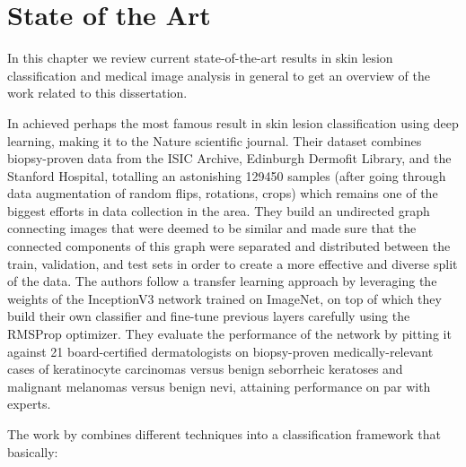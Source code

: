 \chapter{State of the Art}
\label{chapter:sota}

In this chapter we review current state-of-the-art results in skin lesion classification and medical image analysis in general to get an overview of the work related to this dissertation.

In \citeyear{nature2017} \citeauthor{nature2017} \cite{nature2017} achieved perhaps the most famous result in skin lesion classification using deep learning, making it to the Nature scientific journal. Their dataset combines biopsy-proven data from the ISIC Archive, Edinburgh Dermofit Library, and the Stanford Hospital, totalling an astonishing 129450 samples (after going through data augmentation of random flips, rotations, crops) which remains one of the biggest efforts in data collection in the area. They build an undirected graph connecting images that were deemed to be similar and made sure that the connected components of this graph were separated and distributed between the train, validation, and test sets in order to create a more effective and diverse split of the data. The authors follow a transfer learning approach by leveraging the weights of the InceptionV3 network trained on ImageNet, on top of which they build their own classifier and fine-tune previous layers carefully using the RMSProp optimizer. They evaluate the performance of the network by pitting it against 21 board-certified dermatologists on biopsy-proven medically-relevant cases of keratinocyte carcinomas versus benign seborrheic keratoses and malignant melanomas versus benign nevi, attaining performance on par with experts.

The work by \citeauthor{hand_sparse_deeplearning_ensemble} \cite{hand_sparse_deeplearning_ensemble} combines different techniques into a classification framework that basically:

